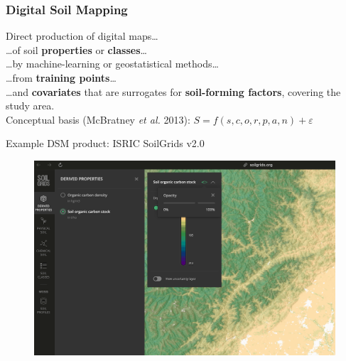 \documentclass[aspectratio=169]{beamer}
\begin{document}
\begin{frame}
\frametitle{Digital Soil Mapping}

Direct production of digital maps\ldots\\
\ldots of soil \textbf{properties} or \textbf{classes}\ldots\\
\ldots by machine-learning or geostatistical methods\ldots\\
\ldots from \textbf{training points}\ldots\\
\ldots and \textbf{covariates} that are surrogates for \textbf{soil-forming factors}, covering the study area.
\\[2ex]
Conceptual basis (McBratney \textit{et al.} 2013): $S = f(s, c, o, r, p, a, n) + \varepsilon$ 
\end{frame}



\begin{frame}{Example DSM product: ISRIC SoilGrids v2.0}
\begin{figure}
    \centering
\includegraphics[height=0.75\textheight]{./graphics_david/SoilGrids_SOCstock_Chengdu.png}
\end{figure}
\end{frame}
\end{document}
